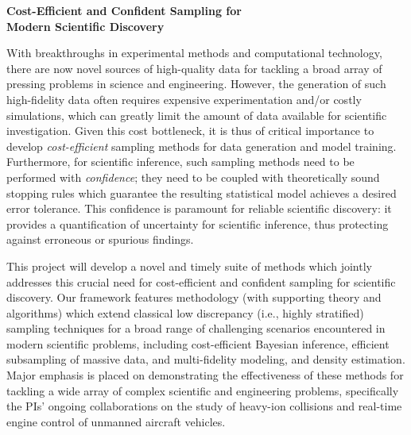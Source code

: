 \documentclass[11pt]{NSFamsart}
\newcommand{\FJHNote}[1]{{\color{blue}Fred: #1}}
\begin{document}

\begin{center}
\Large \textbf{
Cost-Efficient and Confident Sampling for \\ Modern Scientific Discovery
}
\end{center}
%
%



With breakthroughs in experimental methods and computational technology, there are now novel sources of high-quality data for tackling a broad array of pressing problems in science and engineering. However, the generation of such high-fidelity data often requires expensive experimentation and/or costly simulations, which can greatly limit the amount of data available for scientific investigation. Given this cost bottleneck, it is thus of critical importance to develop \textit{cost-efficient} sampling methods for data generation and model training. Furthermore, for scientific inference, such sampling methods need to be performed with \textit{confidence}; they need to be coupled with theoretically sound stopping rules which guarantee the resulting statistical model achieves a desired error tolerance. This confidence is paramount for reliable scientific discovery: it provides a quantification of uncertainty for scientific inference, thus protecting against erroneous or spurious findings.

This project will develop a novel and timely suite of methods which jointly addresses this crucial need for cost-efficient and confident sampling for scientific discovery. Our framework features methodology (with supporting theory and algorithms) which extend classical low discrepancy (i.e., highly stratified) sampling techniques for a broad range of challenging scenarios encountered in modern scientific problems, including cost-efficient Bayesian inference, efficient subsampling of massive data, and multi-fidelity modeling, and density estimation. Major emphasis is placed on demonstrating the effectiveness of these methods for tackling a wide array of complex scientific and engineering problems, specifically the PIs' ongoing collaborations on the study of heavy-ion collisions and real-time engine control of unmanned aircraft vehicles.
\end{document}
